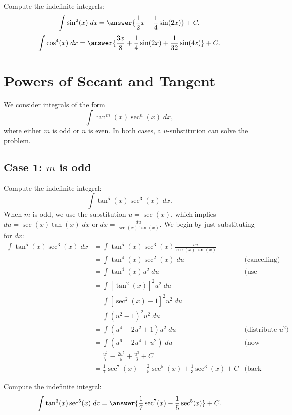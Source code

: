 \documentclass{ximera}
\begin{document}
\begin{problem}
Compute the indefinite integrals:
\[
\int \sin^2(x) \; dx = \answer{\frac12 x - \frac14 \sin(2x)} + C.
\]
\[
\int \cos^4(x) \; dx = \answer{\frac{3x}{8} +\frac14 \sin(2x) + \frac{1}{32}\sin(4x)} + C.
\]
\end{problem}

\section{Powers of Secant and Tangent}
We consider integrals of the form
\[
\int \tan^m(x)\sec^n(x) \; dx,
\]
where either $m$ is odd or $n$ is even. In both cases, a $u$-substitution
can solve the problem. 

\subsection{Case 1: $m$ is odd}
\begin{example}
Compute the indefinite integral:
\[
\int \tan^5(x) \sec^3(x)\;dx.
\]
When $m$ is odd, we use the substitution $u = \sec(x)$,
which implies $du = \sec(x) \tan(x) \; dx$ or $dx = \frac{du}{\sec(x)\tan(x)}$.
We begin by just substituting for $dx$:
\begin{align*}
\int \tan^5(x) \sec^3(x)\;dx &= \int \tan^5(x) \sec^3(x) \frac{du}{\sec(x)\tan(x)}\\
&= \int \tan^4(x) \sec^2(x) \; du & \text{(cancelling)}\\
&= \int \tan^4(x) u^2 \; du & \text{(use Pythagorean identity)}\\
&= \int \left[\tan^2(x)\right]^2 u^2 \; du \\
&= \int \left[\sec^2(x) -1\right]^2 u^2 \; du \\
&= \int \left(u^2 -1\right)^2 u^2 \; du \\
&= \int \left(u^4 - 2u^2 +1\right) u^2 \; du & \text{(distribute $u^2$)}\\
&= \int \left(u^6 - 2u^4 +u^2\right) \; du & \text{(now integrate)}\\
&=  \frac{u^7}{7} - \frac{2u^5}{5} + \frac{u^3}{3} + C  \\
&= \frac17\sec^7(x) - \frac25 \sec^5(x) + \frac13 \sec^3(x) + C & \text{(back substituting)}
\end{align*}
\end{example}

\begin{problem}
Compute the indefinite integral:
\[
\int \tan^3(x) \sec^5(x)\;dx = \answer{\frac17 \sec^7(x) - \frac15 \sec^5(x)} + C.
\]
\end{problem}
\end{document}
